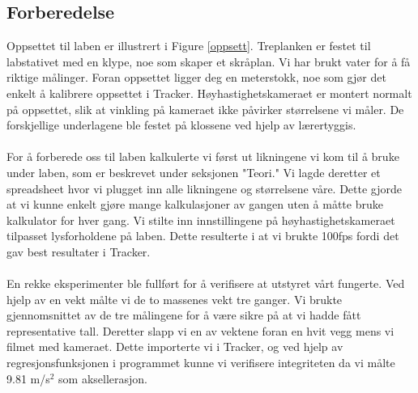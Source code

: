 \documentclass[10pt,a4paper]{report}
\begin{document}
\subsection*{Forberedelse}
Oppsettet til laben er illustrert i Figure \ref{oppsett}. Treplanken er festet til labstativet med en klype, noe som skaper et skråplan. Vi har brukt vater for å få riktige målinger. Foran oppsettet ligger deg en meterstokk, noe som gjør det enkelt å kalibrere oppsettet i Tracker. Høyhastighetskameraet er montert normalt på oppsettet, slik at vinkling på kameraet ikke påvirker størrelsene vi måler. De forskjellige underlagene ble festet på klossene ved hjelp av lærertyggis.\\
\\For å forberede oss til laben kalkulerte vi først ut likningene vi kom til å bruke under laben, som er beskrevet under seksjonen "Teori." Vi lagde deretter et spreadsheet hvor vi plugget inn alle likningene og størrelsene våre. Dette gjorde at vi kunne enkelt gjøre mange kalkulasjoner av gangen uten å måtte bruke kalkulator for hver gang. Vi stilte inn innstillingene på høyhastighetskameraet tilpasset lysforholdene på laben. Dette resulterte i at vi brukte 100fps fordi det gav best resultater i Tracker.\\
\\En rekke eksperimenter ble fullført for å verifisere at utstyret vårt fungerte. Ved hjelp av en vekt målte vi de to massenes vekt tre ganger. Vi brukte gjennomsnittet av de tre målingene for å være sikre på at vi hadde fått representative tall. Deretter slapp vi en av vektene foran en hvit vegg mens vi filmet med kameraet. Dette importerte vi i Tracker, og ved hjelp av regresjonsfunksjonen i programmet kunne vi verifisere integriteten da vi målte 9.81 m/s$^2$ som aksellerasjon.
\end{document}
